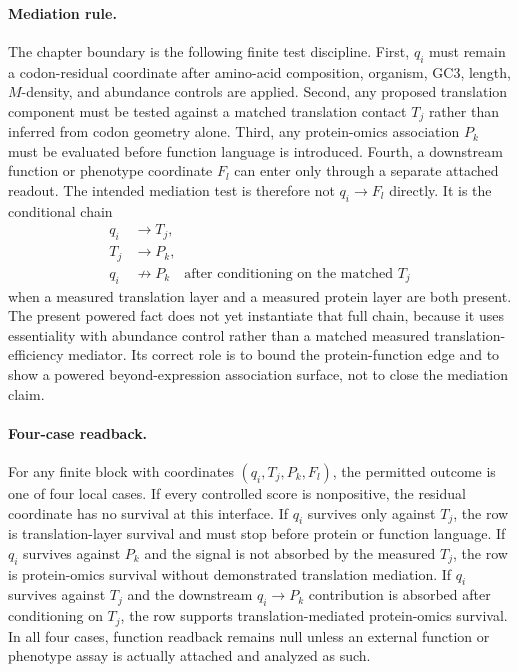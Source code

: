 \paragraph{Mediation rule.}
The chapter boundary is the following finite test discipline.  First, $q_i$ must remain a codon-residual coordinate after amino-acid composition, organism, GC3, length, $M$-density, and abundance controls are applied.  Second, any proposed translation component must be tested against a matched translation contact $T_j$ rather than inferred from codon geometry alone.  Third, any protein-omics association $P_k$ must be evaluated before function language is introduced.  Fourth, a downstream function or phenotype coordinate $F_l$ can enter only through a separate attached readout.  The intended mediation test is therefore not $q_i \to F_l$ directly.  It is the conditional chain
$$
\begin{aligned}
q_i &\longrightarrow T_j,\\
T_j &\longrightarrow P_k,\\
q_i &\not\longrightarrow P_k \quad \text{after conditioning on the matched } T_j
\end{aligned}
$$
when a measured translation layer and a measured protein layer are both present.  The present powered fact does not yet instantiate that full chain, because it uses essentiality with abundance control rather than a matched measured translation-efficiency mediator.  Its correct role is to bound the protein-function edge and to show a powered beyond-expression association surface, not to close the mediation claim.

\paragraph{Four-case readback.}
For any finite block with coordinates $(q_i,T_j,P_k,F_l)$, the permitted outcome is one of four local cases.  If every controlled score is nonpositive, the residual coordinate has no survival at this interface.  If $q_i$ survives only against $T_j$, the row is translation-layer survival and must stop before protein or function language.  If $q_i$ survives against $P_k$ and the signal is not absorbed by the measured $T_j$, the row is protein-omics survival without demonstrated translation mediation.  If $q_i$ survives against $T_j$ and the downstream $q_i \to P_k$ contribution is absorbed after conditioning on $T_j$, the row supports translation-mediated protein-omics survival.  In all four cases, function readback remains null unless an external function or phenotype assay is actually attached and analyzed as such.

